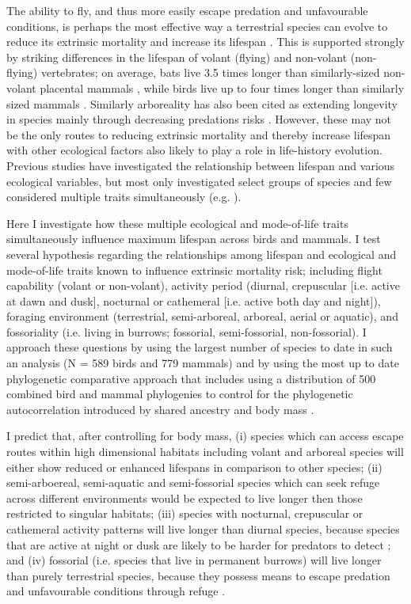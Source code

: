 The ability to fly, and thus more easily escape predation and unfavourable conditions, is perhaps the most effective way a terrestrial species can evolve to reduce its extrinsic mortality and increase its lifespan \citep{partridge1993optimality,holmes1994fly,pomeroy1990fly}. This is supported strongly by striking differences in the lifespan of volant (flying) and non-volant (non-flying) vertebrates; on average, bats live 3.5 times longer than similarly-sized non-volant placental mammals \citep{wilkinson2002life,austad1991mammalian}, while birds live up to four times longer than similarly sized mammals \citep{lindstedt1981body,holmes2003birds}. Similarly arboreality has also been cited as extending longevity in species mainly through decreasing predations risks \citep{shattuck2010arboreality}. However, these may not be the only routes to reducing extrinsic mortality and thereby increase lifespan with other ecological factors also likely to play a role in life-history evolution. Previous studies have investigated the relationship between lifespan and various ecological variables, but most only investigated select groups of species and few considered multiple traits simultaneously (e.g. \cite{shattuck2010arboreality}).

Here I investigate how these multiple ecological and mode-of-life traits simultaneously influence maximum lifespan across birds and mammals. I test several hypothesis regarding the relationships among lifespan and ecological and mode-of-life traits known to influence extrinsic mortality risk; including flight capability (volant or non-volant), activity period (diurnal, crepuscular [i.e. active at dawn and dusk], nocturnal or cathemeral [i.e. active both day and night]), foraging environment (terrestrial, semi-arboreal, arboreal, aerial or aquatic), and fossoriality (i.e. living in burrows; fossorial, semi-fossorial, non-fossorial). I approach these questions by using the largest number of species to date in such an analysis (N =  589 birds and 779 mammals) and by using the most up to date phylogenetic comparative approach that includes using a distribution of 500 combined bird and mammal phylogenies to control for the phylogenetic autocorrelation introduced by shared ancestry \citep{harvey1991comparative} and body mass \citep{lindstedt1981body}.


I predict that, after controlling for body mass, (i) species which can access escape routes within high dimensional habitats including volant and arboreal species will either show reduced or enhanced lifespans in comparison to other species; (ii) semi-arboereal, semi-aquatic and semi-fossorial species which can seek refuge across different environments would be expected to live longer then those restricted to singular habitats; (iii) species with nocturnal, crepuscular or cathemeral activity patterns will live longer than diurnal species, because species that are active at night or dusk are likely to be harder for predators to detect \citep{holmes1994fly,promislow1990living}; and (iv) fossorial (i.e. species that live in permanent burrows) will live longer than purely terrestrial species, because they possess means to escape predation and unfavourable conditions through refuge \citep{buffenstein2002naked}.


